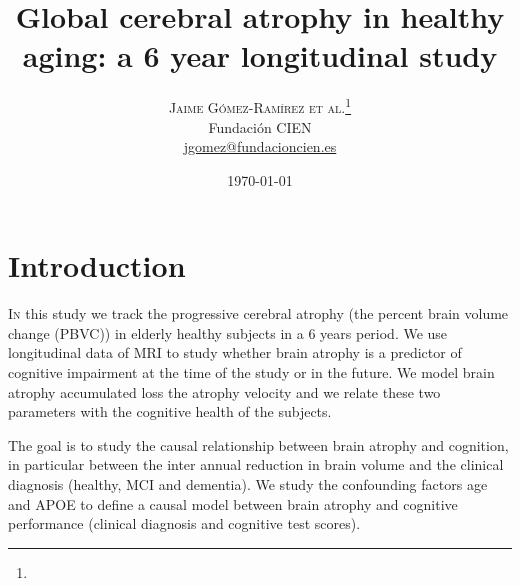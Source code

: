 \documentclass[twoside,onecolumn]{article}
\title{Global cerebral atrophy in healthy aging: a 6 year longitudinal study } %
\author{%
\textsc{Jaime Gómez-Ramírez et al.}\thanks{} \\[1ex] %
\normalsize Fundación CIEN \\ %
\normalsize \href{mailto:john@smith.com}{jgomez@fundacioncien.es} %
}
\date{\today} %
\begin{document}
\maketitle


\section{Introduction}

\lettrine[nindent=0em,lines=3]{I} n this study we track the progressive cerebral atrophy (the percent brain volume change (PBVC)) in elderly healthy subjects in a 6 years period.
We use longitudinal data of MRI to study whether brain atrophy is a predictor of cognitive impairment at the time of the study or in the future. We model brain atrophy accumulated loss the atrophy velocity and we relate these two parameters with the cognitive health of the subjects. 

The goal is to study the causal relationship between brain atrophy and cognition, in particular between the inter annual reduction in brain volume and the clinical diagnosis (healthy, MCI and dementia). We study the confounding factors age and APOE to define a causal model between brain atrophy and cognitive performance (clinical diagnosis and cognitive test scores). 
\end{document}
